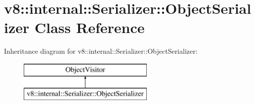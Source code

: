 \hypertarget{classv8_1_1internal_1_1_serializer_1_1_object_serializer}{}\section{v8\+:\+:internal\+:\+:Serializer\+:\+:Object\+Serializer Class Reference}
\label{classv8_1_1internal_1_1_serializer_1_1_object_serializer}
Inheritance diagram for v8\+:\+:internal\+:\+:Serializer\+:\+:Object\+Serializer\+:\begin{figure}[H]
\begin{center}
\leavevmode
\includegraphics[height=2.000000cm]{classv8_1_1internal_1_1_serializer_1_1_object_serializer}
\end{center}
\end{figure}
